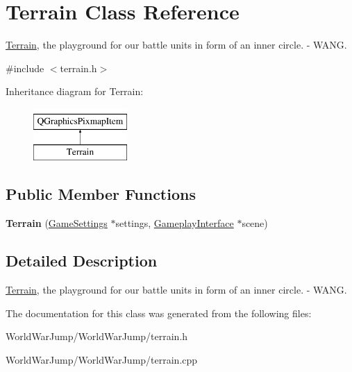 \hypertarget{class_terrain}{}\section{Terrain Class Reference}
\label{class_terrain}


\hyperlink{class_terrain}{Terrain}, the playground for our battle units in form of an inner circle. -\/ W\+A\+NG.  




{\ttfamily \#include $<$terrain.\+h$>$}

Inheritance diagram for Terrain\+:\begin{figure}[H]
\begin{center}
\leavevmode
\includegraphics[height=2.000000cm]{class_terrain}
\end{center}
\end{figure}
\subsection*{Public Member Functions}
\begin{DoxyCompactItemize}
\item 
{\bfseries Terrain} (\hyperlink{class_game_settings}{Game\+Settings} $\ast$settings, \hyperlink{class_gameplay_interface}{Gameplay\+Interface} $\ast$scene)\hypertarget{class_terrain_ac711fed419262cbf10491cd392c0669b}{}\label{class_terrain_ac711fed419262cbf10491cd392c0669b}

\end{DoxyCompactItemize}


\subsection{Detailed Description}
\hyperlink{class_terrain}{Terrain}, the playground for our battle units in form of an inner circle. -\/ W\+A\+NG. 

The documentation for this class was generated from the following files\+:\begin{DoxyCompactItemize}
\item 
World\+War\+Jump/\+World\+War\+Jump/terrain.\+h\item 
World\+War\+Jump/\+World\+War\+Jump/terrain.\+cpp\end{DoxyCompactItemize}
